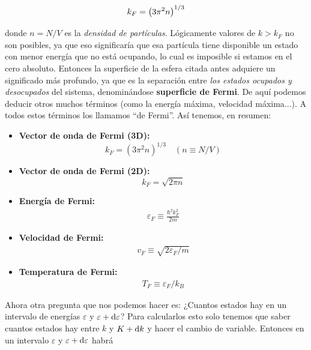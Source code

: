 \begin{mybox}
\begin{equation}
	k_F =  \left( 3\pi^2 n \right)^{1/3}
\end{equation}
\end{mybox}
donde $n=N/V$ es la \textit{densidad de partículas}. Lógicamente valores de $k>k_F$ no son posibles, ya que eso significaría que esa partícula tiene disponible un estado con menor energía que no está ocupando, lo cual es imposible si estamos en el cero absoluto. Entonces la superficie de la esfera citada antes adquiere un significado más profundo, ya que es la separación entre \textit{los estados ocupados y desocupados} del sistema, denominándose \textbf{superficie de Fermi}. De aquí podemos deducir otros muchos términos (como la energía máxima, velocidad máxima...). A todos estos términos los llamamos ``de Fermi''. Así tenemos, en resumen:

\begin{itemize}
	\item \textbf{Vector de onda de Fermi (3D):}
	\begin{equation}
		k_F = (3\pi^2 n)^{1/3} \quad (n\equiv N/V) \label{Ec:06-01-05}
	\end{equation}
	\item \textbf{Vector de onda de Fermi (2D):}
	\begin{equation}
		k_F= \sqrt{2\pi n}
	\end{equation}
	\item \textbf{Energía de Fermi:}
	\begin{eqnarray}
		\varepsilon_F \equiv \frac{\hbar^2 k_F^2}{2m} \label{Ec:06-01-07}
	\end{eqnarray}
	\item \textbf{Velocidad de Fermi:}
	\begin{eqnarray}
		v_F \equiv \sqrt{2\varepsilon_F /m} \label{Ec:06-01-08}
	\end{eqnarray}
	\item \textbf{Temperatura de Fermi:}
	\begin{eqnarray}
		T_F \equiv \varepsilon_F / k_B
	\end{eqnarray}
\end{itemize}
Ahora otra pregunta que nos podemos hacer es: ¿Cuantos estados hay en un intervalo de energías $\varepsilon$ y $\varepsilon+\mathrm{d} \varepsilon$? Para calcularlos esto solo tenemos que saber cuantos estados hay entre $k$ y $K+\mathrm{d} k$ y hacer el cambio de variable. Entonces en un intervalo $\varepsilon$ y $\varepsilon+\mathrm{d} \varepsilon$ habrá 

